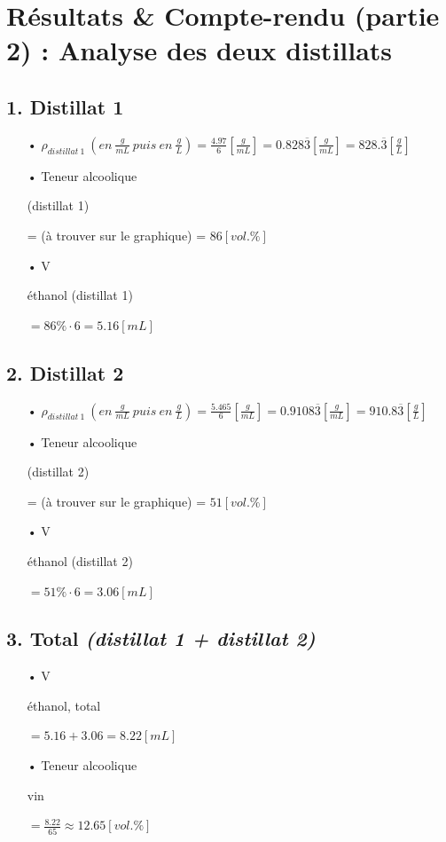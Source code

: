 \documentclass[11pt]{article}
\begin{document}
\section*{Résultats \& Compte-rendu (partie 2) : Analyse des deux distillats}
\subsection*{1. Distillat 1}
\begin{itemize}
\item[•] $\rho_{distillat \: 1} \: \left( en \: \frac{g}{mL} \: puis \: en \: \frac{g}{L} \right) = \frac{4.97}{6}\left[\frac{g}{mL}\right] = 0.828\overline{3} \left[\frac{g}{mL}\right] = 828.\overline{3} \left[\frac{g}{L}\right]$
\item[•] Teneur alcoolique\begin{tiny}(distillat 1)\end{tiny} = (à trouver sur le graphique) = $86 [vol. \%]$
\item[•] V\begin{tiny}éthanol (distillat 1)\end{tiny} $= 86 \% \cdot 6 = 5.16 [mL]$ 
\end{itemize}

\subsection*{2. Distillat 2}
\begin{itemize}
\item[•] $\rho_{distillat \: 1} \: \left( en \: \frac{g}{mL} \: puis \: en \: \frac{g}{L} \right) = \frac{5.465}{6}\left[\frac{g}{mL}\right] = 0.9108\overline{3} \left[\frac{g}{mL}\right] = 910.8\overline{3} \left[\frac{g}{L}\right]$
\item[•] Teneur alcoolique\begin{tiny}(distillat 2)\end{tiny} = (à trouver sur le graphique) = $51 [vol. \%]$
\item[•] V\begin{tiny}éthanol (distillat 2)\end{tiny} $= 51 \% \cdot 6 = 3.06 [mL]$ 
\end{itemize}

\subsection*{3. Total \textit{(distillat 1 + distillat 2)}}
\begin{itemize}
\item[•] V\begin{tiny}éthanol, total\end{tiny} $= 5.16 + 3.06 = 8.22 [mL]$ 
\item[•] Teneur alcoolique\begin{tiny}vin\end{tiny} $= \frac{8.22}{65} \approx 12.65 [vol. \%]$ 
\end{itemize}
\end{document}
